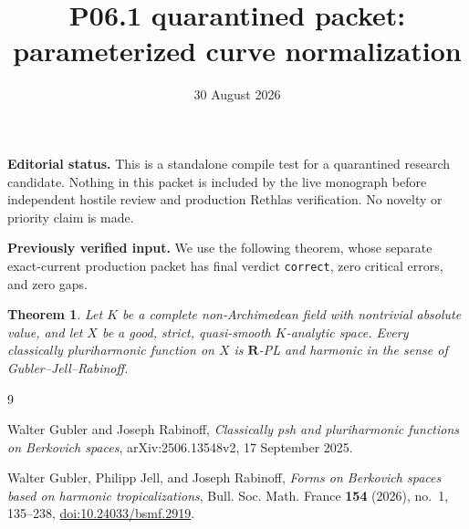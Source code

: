 \documentclass[11pt]{article}
\title{P06.1 quarantined packet: parameterized curve normalization}
\author{}
\date{30 August 2026}
\newtheorem{theorem}{Theorem}
\begin{document}
\maketitle

\noindent
\textbf{Editorial status.}
This is a standalone compile test for a quarantined research candidate.
Nothing in this packet is included by the live monograph before independent
hostile review and production Rethlas verification.  No novelty or priority
claim is made.

\medskip
\noindent
\textbf{Previously verified input.}
We use the following theorem, whose separate exact-current production packet
has final verdict \texttt{correct}, zero critical errors, and zero gaps.
\begin{theorem}
\label{thm:p061-quasismooth-ph-rpl}
Let \(K\) be a complete non-Archimedean field with nontrivial absolute
value, and let \(X\) be a good, strict, quasi-smooth \(K\)-analytic space.
Every classically pluriharmonic function on \(X\) is \(\mathbf R\)-PL and
harmonic in the sense of Gubler--Jell--Rabinoff.
\end{theorem}




\begin{thebibliography}{9}

Walter Gubler and Joseph Rabinoff,
\emph{Classically psh and pluriharmonic functions on Berkovich spaces},
arXiv:2506.13548v2, 17 September 2025.

Walter Gubler, Philipp Jell, and Joseph Rabinoff,
\emph{Forms on Berkovich spaces based on harmonic tropicalizations},
Bull. Soc. Math. France \textbf{154} (2026), no.~1, 135--238,
\href{https://doi.org/10.24033/bsmf.2919}{doi:10.24033/bsmf.2919}.

\end{thebibliography}
\end{document}
